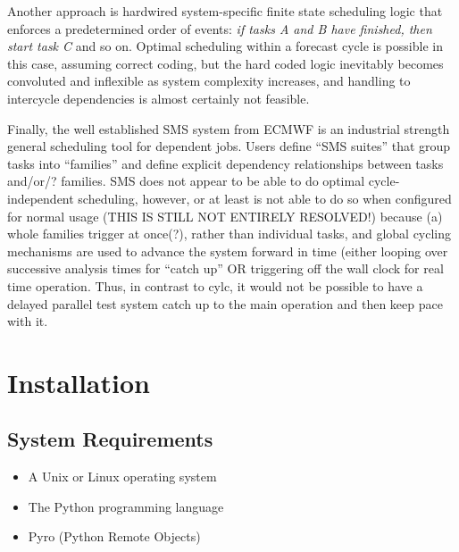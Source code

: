 \documentclass[11pt,a4paper]{article}
\begin{document}
Another approach is hardwired system-specific finite state scheduling
logic that enforces a predetermined order of events: {\em if tasks A and
B have finished, then start task C} and so on. Optimal scheduling within
a forecast cycle is possible in this case, assuming correct coding, but
the hard coded logic inevitably becomes convoluted and inflexible as
system complexity increases, and handling to intercycle dependencies is
almost certainly not feasible.  

Finally, the well established SMS system from ECMWF is an industrial
strength general scheduling tool for dependent jobs. Users define ``SMS
suites'' that group tasks into ``families'' and define explicit
dependency relationships between tasks and/or/? families. SMS does not
appear to be able to do optimal cycle-independent scheduling, however,
or at least is not able to do so when configured for normal usage (THIS
IS STILL NOT ENTIRELY RESOLVED!) because (a) whole families trigger 
at once(?), rather than individual tasks, and global cycling mechanisms
are used to advance the system forward in time (either looping
over successive analysis times for ``catch up'' OR triggering off the
wall clock for real time operation. Thus, in contrast to cylc, it would
not be possible to have a delayed parallel test system catch up to the
main operation and then keep pace with it.




\pagebreak
\section{Installation}
\label{sec:usage}

\subsection{System Requirements}

\begin{itemize}
    \item A Unix or Linux operating system
    \item The Python programming language
    \item Pyro (Python Remote Objects)
\end{itemize}
\end{document}
